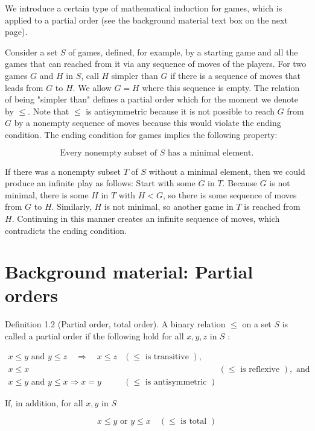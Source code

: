 \documentclass[12pt]{article}
\begin{document}
We introduce a certain type of mathematical induction for games, which is applied to a partial order (see the background material text box on the next page).

Consider a set $S$ of games, defined, for example, by a starting game and all the games that can reached from it via any sequence of moves of the players. For two games $G$ and $H$ in $S$, call $H$ simpler than $G$ if there is a sequence of moves that leads from $G$ to $H$. We allow $G=H$ where this sequence is empty. The relation of being "simpler than" defines a partial order which for the moment we denote by $\leq$. Note that $\leq$ is antisymmetric because it is not possible to reach $G$ from $G$ by a nonempty sequence of moves because this would violate the ending condition. The ending condition for games implies the following property:


\begin{equation*}
\text { Every nonempty subset of } S \text { has a minimal element. } \tag{1.8}
\end{equation*}


If there was a nonempty subset $T$ of $S$ without a minimal element, then we could produce an infinite play as follows: Start with some $G$ in $T$. Because $G$ is not minimal, there is some $H$ in $T$ with $H<G$, so there is some sequence of moves from $G$ to $H$. Similarly, $H$ is not minimal, so another game in $T$ is reached from $H$. Continuing in this manner creates an infinite sequence of moves, which contradicts the ending condition.

\section*{Background material: Partial orders}
Definition 1.2 (Partial order, total order). A binary relation $\leq$ on a set $S$ is called a partial order if the following hold for all $x, y, z$ in $S$ :

$$
\begin{array}{lll}
x \leq y \text { and } y \leq z \quad \Rightarrow \quad x \leq z & (\leq \text { is transitive }), \\
x \leq x & & (\leq \text { is reflexive }), \text { and } \\
x \leq y \text { and } y \leq x \Rightarrow x=y & (\leq \text { is antisymmetric }) .
\end{array}
$$

If, in addition, for all $x, y$ in $S$

$$
x \leq y \text { or } y \leq x \quad(\leq \text { is total })
$$
\end{document}
